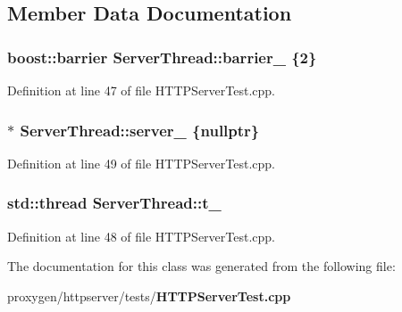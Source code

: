 \subsection{Member Data Documentation}
\subsubsection[{barrier\+\_\+}]{\setlength{\rightskip}{0pt plus 5cm}boost\+::barrier Server\+Thread\+::barrier\+\_\+ \{2\}\hspace{0.3cm}{\ttfamily [private]}}\label{classServerThread_adbae875712370d2771692cc464d92d6f}


Definition at line 47 of file H\+T\+T\+P\+Server\+Test.\+cpp.

\subsubsection[{server\+\_\+}]{$\ast$ Server\+Thread\+::server\+\_\+ \{{\bf nullptr}\}\hspace{0.3cm}{\ttfamily [private]}}\label{classServerThread_ab0069922b45e8a4bb8ba048eb31625f0}


Definition at line 49 of file H\+T\+T\+P\+Server\+Test.\+cpp.

\subsubsection[{t\+\_\+}]{\setlength{\rightskip}{0pt plus 5cm}std\+::thread Server\+Thread\+::t\+\_\+\hspace{0.3cm}{\ttfamily [private]}}\label{classServerThread_a2b65b970dcde932a653f9d13ab4280bb}


Definition at line 48 of file H\+T\+T\+P\+Server\+Test.\+cpp.



The documentation for this class was generated from the following file\+:\begin{DoxyCompactItemize}
\item 
proxygen/httpserver/tests/{\bf H\+T\+T\+P\+Server\+Test.\+cpp}\end{DoxyCompactItemize}
